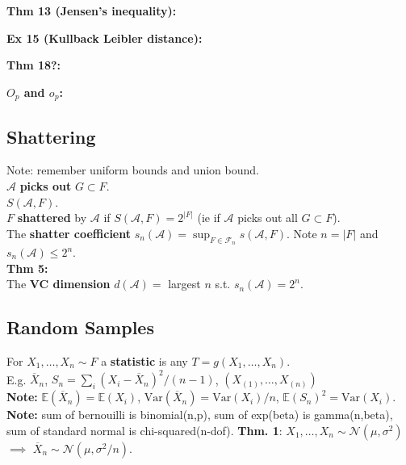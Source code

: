 \documentclass[10pt,twocolumn]{article}
\begin{document}
\textbf{Thm 13 (Jensen's inequality):}

\textbf{Ex 15 (Kullback Leibler distance):}

\textbf{Thm 18?:}

\textbf{$O_{p}$ and $o_{p}$:}


\subsection*{Shattering}
Note: remember uniform bounds and union bound.\\
$\mathcal{A}$ \textbf{picks out} $G \subset F$.\\
$S(\mathcal{A},F)$.\\
$F$ \textbf{shattered} by $\mathcal{A}$ if $S(\mathcal{A},F) = 2^{|F|}$ (ie if $\mathcal{A}$ picks out all $G \subset F$).\\
The \textbf{shatter coefficient} $s_{n}(\mathcal{A}) = \sup_{F \in \mathcal{F}_{n}} s(\mathcal{A},F)$. Note $n=|F|$ and $s_{n}(\mathcal{A}) \leq 2^{n}$.\\
\textbf{Thm 5:}\\
The \textbf{VC dimension} $d(\mathcal{A}) =$ largest $n$ s.t. $s_{n}(\mathcal{A}) = 2^{n}$.


\subsection*{Random Samples}
For $X_{1},\ldots,X_{n} \sim F$ a \textbf{statistic} is any $T = g(X_{1},\ldots,X_{n})$.\\
E.g. $\overline{X}_{n}$, $S_{n} = \sum_{i}(X_{i}-\overline{X}_{n})^{2} / (n-1)$, $\left(X_{(1)},\ldots,X_{(n)}\right)$\\
\textbf{Note:} $\mathbb{E}(\overline{X}_{n}) = \mathbb{E}(X_{i})$, $\text{Var}(\overline{X}_{n}) = \text{Var}(X_{i})/n$, $\mathbb{E}(S_{n})^{2} = \text{Var}(X_{i})$.\\
\textbf{Note:} sum of bernouilli is binomial(n,p), sum of exp(beta) is gamma(n,beta), sum of standard normal is chi-squared(n-dof).
\textbf{Thm. 1}: $X_{1},\ldots,X_{n} \sim \mathcal{N}(\mu,\sigma^{2})$ $\implies$  $\overline{X}_{n} \sim \mathcal{N}(\mu, \sigma^{2}/n)$.
\end{document}
